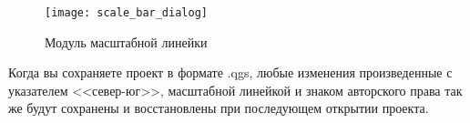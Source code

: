 \begin{figure}[ht]
   \centering
   \texttt{[image: scale\_bar\_dialog]}
   \caption{Модуль масштабной линейки \wincaption}\label{fig:scale_bar}
\end{figure}

\begin{Tip}\caption{\textsc{Сохранение в проекте настроек модулей}}
Когда вы сохраняете проект в формате .qgs, любые изменения произведенные
с указателем <<север-юг>>, масштабной линейкой и знаком авторского права
так же будут сохранены и восстановлены при последующем открытии проекта.
\end{Tip}

\FloatBarrier
